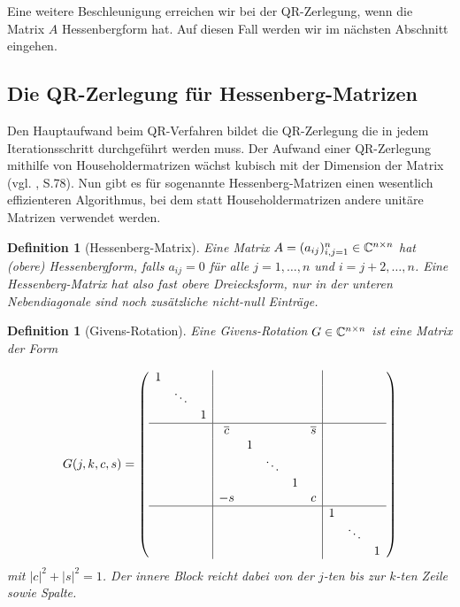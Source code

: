 \documentclass{article}
\theoremstyle{plain}
\newtheorem{definition} [theorem]{Definition}
\begin{document}
Eine weitere Beschleunigung erreichen wir bei der QR-Zerlegung, wenn die Matrix $A$ Hessenbergform hat. Auf diesen Fall werden wir im nächsten Abschnitt eingehen.

\subsection{Die QR-Zerlegung für Hessenberg-Matrizen}

Den Hauptaufwand beim QR-Verfahren bildet die QR-Zerlegung die in jedem Iterationsschritt durchgeführt werden muss. Der Aufwand einer QR-Zerlegung mithilfe von Householdermatrizen wächst kubisch mit der Dimension der Matrix (vgl. \cite{Num}, S.78). Nun gibt es für sogenannte Hessenberg-Matrizen einen wesentlich effizienteren Algorithmus, bei dem statt Householdermatrizen andere unitäre Matrizen verwendet werden.

\begin{definition}[Hessenberg-Matrix]
	Eine Matrix $A = (a_{ij})_{i,j = 1}^n \in \mathbb{C}^{n \times n}$ hat (obere) Hessenbergform, falls $a_{ij} = 0$ für alle $j = 1,\dots,n$ und $i = j+2, \dots, n$. Eine Hessenberg-Matrix hat also fast obere Dreiecksform, nur in der unteren Nebendiagonale sind noch zusätzliche nicht-null Einträge.
\end{definition}

\begin{definition}[Givens-Rotation]
	Eine Givens-Rotation $G \in \mathbb{C}^{n\times n}$ ist eine Matrix der Form

	\begin{align*}
	G(j,k,c,s)  = \left(\begin{array}{ccc|ccccc|ccc}
	1 &  &  & & & & & & &\\
	& \ddots & & & & & & & & &\\
	& & 1 & & & & & & & \\
	\hline
	& & &  \overline{c} & & & & \overline{s} & & &\\
	& & & & 1 & & & & & &\\
	& & & & & \ddots & & & & &\\
	& & & & &  &1 & & & &\\
	& & & -s & & & & c & & &\\
	\hline
	& & & & & & & & 1 & &\\
	& & & & & & & & & \ddots &\\
	& & & & & & & & & & 1\\
	\end{array}\right)
	\end{align*}
	mit $|c|^2 + |s|^2 = 1$. Der innere Block reicht dabei von der $j$-ten bis zur $k$-ten Zeile sowie Spalte.
\end{definition}
\end{document}
